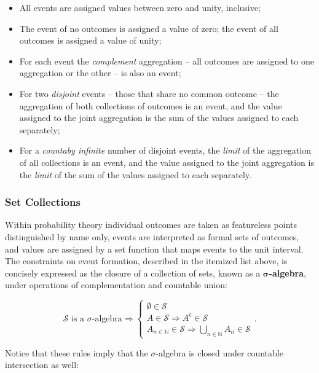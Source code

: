 \documentclass[12pt, twoside, draft]{article}
\begin{document}
\begin{itemize}[noitemsep]
\item All events are assigned values between zero and unity, inclusive;
\item The event of no outcomes is assigned a value of zero; the event of all outcomes is assigned a value of unity;
\item For each event the \textit{complement} aggregation -- all outcomes are assigned to one aggregation or the other -- is also an event;
\item For two \textit{disjoint} events -- those that share no common outcome -- the aggregation of both collections of outcomes is an event, and the value assigned to the joint aggregation is the sum of the values assigned to each separately;
\item For a \textit{countaby infinite} number of disjoint events, the \textit{limit} of the aggregation of  all collections is an event, and the value assigned to the joint aggregation is the \textit{limit} of the sum of the values assigned to each separately.
\end{itemize}

\subsubsection{Set Collections}\label{sec:set_collections}

Within probability theory individual outcomes are taken as featureless points distinguished by name only, events are interpreted as formal sets of outcomes, and values are assigned by a set function that maps events to the unit interval.  The constraints on event formation, described in the itemized list above, is concisely expressed as the closure of a collection of sets, known as a $\boldsymbol{\sigma}$\textbf{-algebra}, under operations of complementation and countable union:

\begin{equation}\label{eq:sigma-algebra}
\mathcal{S} \text{ is a }\sigma \text{-algebra} \Rightarrow
\begin{cases}
\emptyset \in \mathcal{S} \\
A \in \mathcal{S} \Rightarrow A^{\mathsf{c}} \in \mathcal{S} \\
A_{n\in \mathbb{N}} \in \mathcal{S} \Rightarrow \bigcup_{n\in \mathbb{N}}A_n \in \mathcal{S}
\end{cases}.
\end{equation}

Notice that these rules imply that the $\sigma$-algebra is closed under countable intersection as well: 
\end{document}
